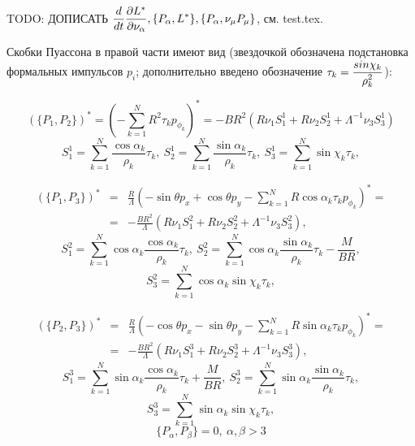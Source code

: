TODO: ДОПИСАТЬ $\displaystyle\frac{\displaystyle d}{\displaystyle dt}\frac{\partial L^{*}}{\partial \nu_\alpha}, \{P_\alpha, L^{*}\}, \{P_\alpha, \nu_\mu P_\mu\}$, см. test.tex.

Скобки Пуассона в правой части имеют вид (звездочкой обозначена подстановка формальных импульсов $p_i$; дополнительно введено обозначение $\tau_k = \displaystyle\frac{\displaystyle sin\chi_k}{\displaystyle \rho_k^2}$):

$$
(\{P_1,P_2\})^* = (-\sum\limits_{k=1}^{N} R^2\tau_kp_{\phi_k})^* =
-BR^2(R\nu_1 S_1^1 + R\nu_2 S_2^1 + \Lambda^{-1}\nu_3S_3^1)$$
$$
S_1^1 = \sum\limits_{k=1}^{N}\frac{\cos\alpha_k}{\rho_k}\tau_k,\
S_2^1 = \sum\limits_{k=1}^{N}\frac{\sin\alpha_k}{\rho_k}\tau_k,\
S_3^1 = \sum\limits_{k=1}^{N}\sin\chi_k\tau_k,
$$

\begin{eqnarray*}
(\{P_1,P_3\})^* &=& \frac{R}{\Lambda}\left(-\sin\theta p_x + \cos\theta p_y - \sum\limits_{k=1}^{N} R\cos\alpha_k\tau_kp_{\phi_k}\right)^* =\\
&=& -\frac{BR^2}{\Lambda}(R\nu_1 S_1^2 + R\nu_2 S_2^2 + \Lambda^{-1}\nu_3S_3^2),
\end{eqnarray*}
$$
S_1^2 = \sum\limits_{k=1}^{N}\cos\alpha_k\frac{\cos\alpha_k}{\rho_k}\tau_k,\
S_2^2 = \sum\limits_{k=1}^{N}\cos\alpha_k\frac{\sin\alpha_k}{\rho_k}\tau_k - \frac{M}{BR},
$$$$
S_3^2 = \sum\limits_{k=1}^{N}\cos\alpha_k\sin\chi_k\tau_k,
$$

\begin{eqnarray*}
(\{P_2,P_3\})^* &=& \frac{R}{\Lambda}\left(-\cos\theta p_x - \sin\theta p_y - \sum\limits_{k=1}^{N} R\sin\alpha_k\tau_kp_{\phi_k}\right)^*  =\\
&=& -\frac{BR^2}{\Lambda}(R\nu_1 S_1^3 + R\nu_2 S_2^3 + \Lambda^{-1}\nu_3S_3^3),
\end{eqnarray*}
$$
S_1^3 = \sum\limits_{k=1}^{N}\sin\alpha_k\frac{\cos\alpha_k}{\rho_k}\tau_k + \frac{M}{BR},\
S_2^3 = \sum\limits_{k=1}^{N}\sin\alpha_k\frac{\sin\alpha_k}{\rho_k}\tau_k,
$$$$
S_3^3 = \sum\limits_{k=1}^{N}\sin\alpha_k\sin\chi_k\tau_k,
$$
$$
\{P_\alpha, P_\beta\} =0,\ \alpha,\beta >3
$$